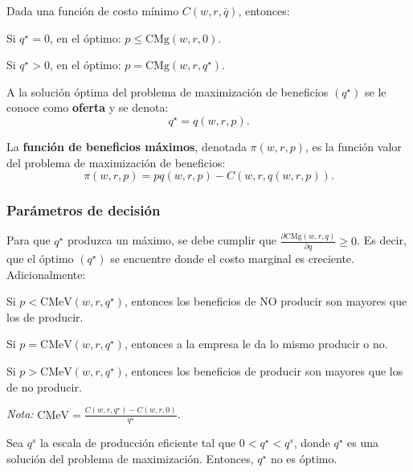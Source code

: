 \documentclass[8pt,a4paper]{extarticle}
\begin{document}
\begin{multicols}{3}
Dada una función de costo mínimo $C (w, r, \bar{q})$, entonces:

\begin{bulletlist}
\item Si $q^\star = 0$, en el óptimo: $p \le \text{CMg} (w, r, 0)$.
\item Si $q^\star > 0$, en el óptimo: $p = \text{CMg} (w, r, q^\star)$.
\end{bulletlist}

\begin{boxdef}[Oferta]
	A la solución óptima del problema de maximización de beneficios $(q^\star)$ se le conoce como \textbf{oferta} y se denota:
	\[
		q^\star = q(w, r, p)
	.\] 
\end{boxdef}

\begin{boxdef}
	La \textbf{función de beneficios máximos}, denotada $\pi(w, r, p)$, es la función valor del problema de maximización de beneficios:
	\[
		\pi (w, r, p) = pq(w, r, p) - C (w, r, q(w, r, p))
	.\] 
\end{boxdef}

\subsubsection*{Parámetros de decisión}

Para que $q^\star$ produzca un máximo, se debe cumplir que $\displaystyle \frac{\partial \text{CMg} (w, r, q)}{\partial q} \ge 0$. Es decir, que el óptimo $(q^\star)$ se encuentre donde el costo marginal es creciente. Adicionalmente:

\begin{eqlist}
\item Si $p < \text{CMeV} (w, r, q^\star)$, entonces los beneficios de NO producir son mayores que los de producir.
\item Si $p = \text{CMeV} (w, r, q^\star)$, entonces a la empresa le da lo mismo producir o no.
\item Si $p > \text{CMeV} (w, r, q^\star)$, entonces los beneficios de producir son mayores que los de no producir.
\end{eqlist}

\textit{Nota:} $\displaystyle \text{CMeV} = \frac{C(w, r, q^\star) - C(w, r, 0)}{q^\star}$.

\begin{boxprop}
	Sea $q^s$ la escala de producción eficiente tal que $0 < q^\star < q^s$, donde $q^\star$ es una solución del problema de maximización. Entonces, $q^\star$ no es óptimo.
\end{boxprop}


\end{multicols}
\end{document}
